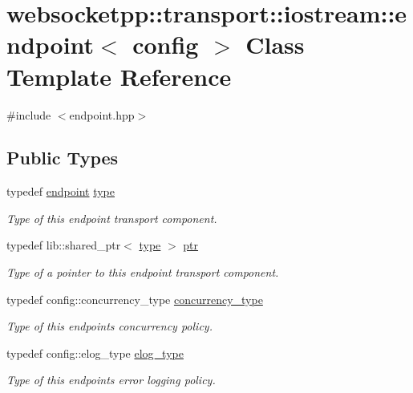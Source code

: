 \hypertarget{classwebsocketpp_1_1transport_1_1iostream_1_1endpoint}{}\section{websocketpp\+:\+:transport\+:\+:iostream\+:\+:endpoint$<$ config $>$ Class Template Reference}
\label{classwebsocketpp_1_1transport_1_1iostream_1_1endpoint}


{\ttfamily \#include $<$endpoint.\+hpp$>$}

\subsection*{Public Types}
\begin{DoxyCompactItemize}
\item 
typedef \hyperlink{classwebsocketpp_1_1transport_1_1iostream_1_1endpoint}{endpoint} \hyperlink{classwebsocketpp_1_1transport_1_1iostream_1_1endpoint_abc21958efa2ee99de526036fb21f5320}{type}
\begin{DoxyCompactList}\small\item\em Type of this endpoint transport component. \end{DoxyCompactList}\item 
typedef lib\+::shared\+\_\+ptr$<$ \hyperlink{classwebsocketpp_1_1transport_1_1iostream_1_1endpoint_abc21958efa2ee99de526036fb21f5320}{type} $>$ \hyperlink{classwebsocketpp_1_1transport_1_1iostream_1_1endpoint_a508eb595a20c2b0a15a27d68a7c0bd93}{ptr}
\begin{DoxyCompactList}\small\item\em Type of a pointer to this endpoint transport component. \end{DoxyCompactList}\item 
typedef config\+::concurrency\+\_\+type \hyperlink{classwebsocketpp_1_1transport_1_1iostream_1_1endpoint_ad7787af753771da00bf8e6477e52b615}{concurrency\+\_\+type}
\begin{DoxyCompactList}\small\item\em Type of this endpoint\textquotesingle{}s concurrency policy. \end{DoxyCompactList}\item 
typedef config\+::elog\+\_\+type \hyperlink{classwebsocketpp_1_1transport_1_1iostream_1_1endpoint_a0aafebd80866c13bef4caa45e48a8ede}{elog\+\_\+type}
\begin{DoxyCompactList}\small\item\em Type of this endpoint\textquotesingle{}s error logging policy. \end{DoxyCompactList}\item 

\end{DoxyCompactItemize}
